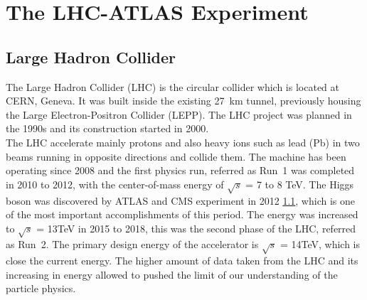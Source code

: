 \chapter{The LHC-ATLAS Experiment}
\section{Large Hadron Collider}

The Large Hadron Collider (LHC) is the circular collider which is located at CERN, Geneva. It was built inside the existing 27~km tunnel, previously housing the Large Electron-Positron Collider (LEPP). The LHC project was planned in the 1990s and its construction started in 2000. \\
The LHC accelerate mainly protons and also heavy ions such as lead (Pb) in two beams running in opposite directions and collide them. 
The machine has been operating since 2008 and the first physics run, referred as Run~1 was completed in 2010 to 2012, with the center-of-mass energy of $\sqrt{s}$ = 7 to 8 TeV. The Higgs boson was discovered by ATLAS and CMS experiment in 2012 \ref{}, which is one of the most important accomplishments of this period. The energy was increased to $\sqrt{s}$ = 13TeV in 2015 to 2018, this was the second phase of the LHC, referred as Run~2. The primary design energy of the accelerator is $\sqrt{s}$ = 14TeV, which is close the current energy.
The higher amount of data taken from the LHC and its increasing in energy allowed to pushed the limit of our understanding of the particle physics. 
